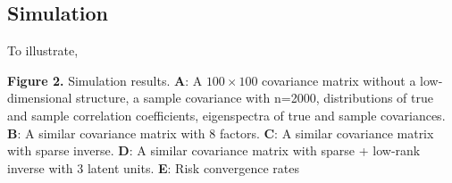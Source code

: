 \subsection{Simulation}
To illustrate,

\textbf{Figure 2.}{
Simulation results. 
\textbf{A}: A $100 \times 100$ covariance matrix without a low-dimensional structure, a sample covariance with n=2000, distributions of true and sample correlation coefficients, eigenspectra of true and sample covariances.
\textbf{B}: A similar covariance matrix with 8 factors.
\textbf{C}: A similar covariance matrix with sparse inverse. 
\textbf{D}: A similar covariance matrix with sparse + low-rank inverse with 3 latent units.
\textbf{E}: Risk convergence rates
}\label{fig:02}
